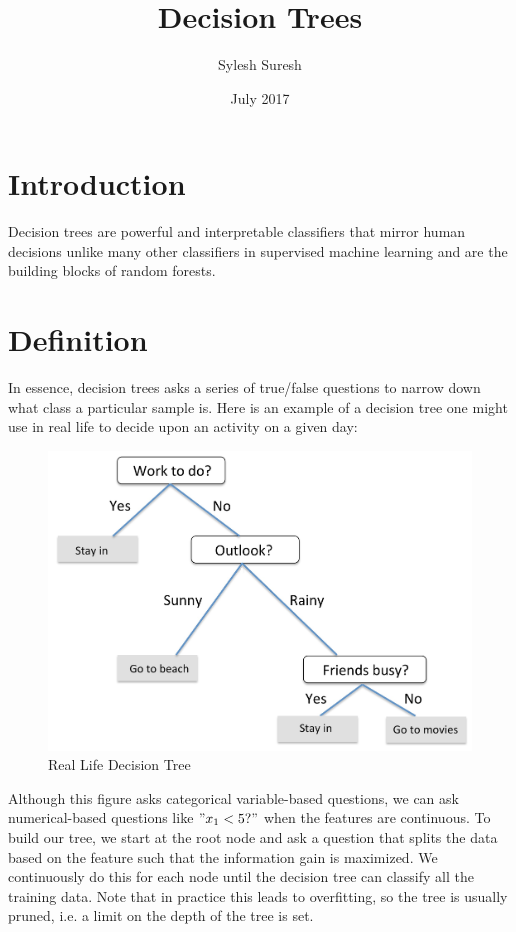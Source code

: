 \documentclass{article}
\title{Decision Trees}
\author{Sylesh Suresh }
\date{July 2017}
\begin{document}
\maketitle

\section{Introduction}
Decision trees are powerful and interpretable classifiers that mirror human decisions unlike many other classifiers in supervised machine learning and are the building blocks of random forests. 
\section{Definition}
In essence, decision trees asks a series of true/false questions to narrow down what class a particular sample is. Here is an example of a decision tree one might use in real life to decide upon an activity on a given day:

\begin{figure}[h!]
\centering
\includegraphics[scale=0.2]{dtree.jpg}
\caption{Real Life Decision Tree}
\label{fig:decisiontree}
\end{figure}

Although this figure asks categorical variable-based questions, we can ask numerical-based questions like \("x_1 < 5?"\) when the features are continuous. To build our tree, we start at the root node and ask a question that splits the data based on the feature such that the information gain is maximized. We continuously do this for each node until the decision tree can classify all the training data. Note that in practice this leads to overfitting, so the tree is usually pruned, i.e. a limit on the depth of the tree is set. 
\end{document}
